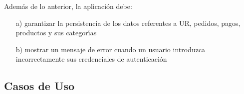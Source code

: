 \documentclass[a4paper,11pt]{report}
\begin{document}
    Adem\'as de lo anterior, la aplicaci\'on debe:
    \begin{enumerate}
        \item[a)] garantizar la persistencia de los datos referentes a UR, pedidos, pagos, productos y sus categor\'\i{}as
        \item[b)] mostrar un mensaje de error cuando un usuario introduzca incorrectamente sus credenciales de autenticaci\'on
    \end{enumerate}

    \subsection{Casos de Uso}













\end{document}
